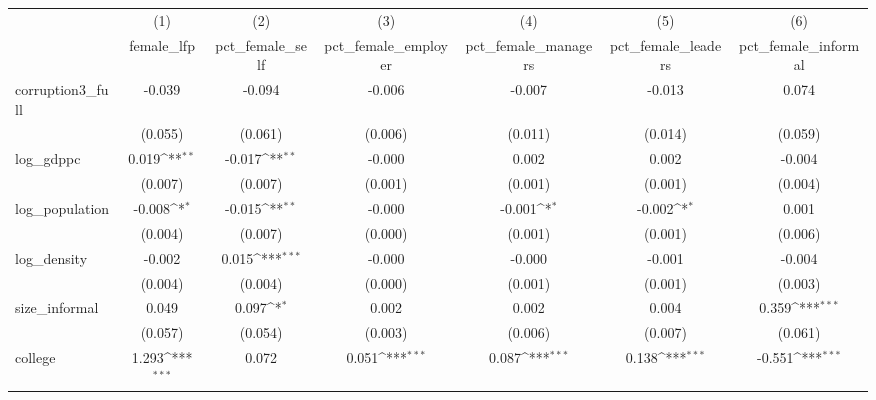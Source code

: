 {
\def\sym#1{\ifmmode^{#1}\else\(^{#1}\)\fi}
\begin{tabular}{l*{6}{c}}
\hline\hline
            &\multicolumn{1}{c}{(1)}&\multicolumn{1}{c}{(2)}&\multicolumn{1}{c}{(3)}&\multicolumn{1}{c}{(4)}&\multicolumn{1}{c}{(5)}&\multicolumn{1}{c}{(6)}\\
            &\multicolumn{1}{c}{female\_lfp}&\multicolumn{1}{c}{pct\_female\_self}&\multicolumn{1}{c}{pct\_female\_employer}&\multicolumn{1}{c}{pct\_female\_managers}&\multicolumn{1}{c}{pct\_female\_leaders}&\multicolumn{1}{c}{pct\_female\_informal}\\
\hline
corruption3\_full&      -0.039         &      -0.094         &      -0.006         &      -0.007         &      -0.013         &       0.074         \\
            &     (0.055)         &     (0.061)         &     (0.006)         &     (0.011)         &     (0.014)         &     (0.059)         \\
[1em]
log\_gdppc   &       0.019\sym{**} &      -0.017\sym{**} &      -0.000         &       0.002         &       0.002         &      -0.004         \\
            &     (0.007)         &     (0.007)         &     (0.001)         &     (0.001)         &     (0.001)         &     (0.004)         \\
[1em]
log\_population&      -0.008\sym{*}  &      -0.015\sym{**} &      -0.000         &      -0.001\sym{*}  &      -0.002\sym{*}  &       0.001         \\
            &     (0.004)         &     (0.007)         &     (0.000)         &     (0.001)         &     (0.001)         &     (0.006)         \\
[1em]
log\_density &      -0.002         &       0.015\sym{***}&      -0.000         &      -0.000         &      -0.001         &      -0.004         \\
            &     (0.004)         &     (0.004)         &     (0.000)         &     (0.001)         &     (0.001)         &     (0.003)         \\
[1em]
size\_informal&       0.049         &       0.097\sym{*}  &       0.002         &       0.002         &       0.004         &       0.359\sym{***}\\
            &     (0.057)         &     (0.054)         &     (0.003)         &     (0.006)         &     (0.007)         &     (0.061)         \\
[1em]
college     &       1.293\sym{***}&       0.072         &       0.051\sym{***}&       0.087\sym{***}&       0.138\sym{***}&      -0.551\sym{***}\\

\end{tabular}}
